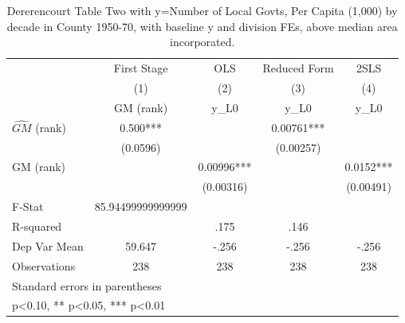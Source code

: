 \begin{table}[htbp]\centering
\def\sym#1{\ifmmode^{#1}\else\(^{#1}\)\fi}
\caption{Dererencourt Table Two with y=Number of Local Govts, Per Capita (1,000) by decade in County 1950-70, with baseline y and division FEs, above median area incorporated.}
\begin{tabular}{l*{4}{c}}
\toprule
                    & First Stage   &         OLS   &Reduced Form   &        2SLS   \\
                    &\multicolumn{1}{c}{(1)}&\multicolumn{1}{c}{(2)}&\multicolumn{1}{c}{(3)}&\multicolumn{1}{c}{(4)}\\
                    &\multicolumn{1}{c}{GM  (rank)}&\multicolumn{1}{c}{y\_L0}&\multicolumn{1}{c}{y\_L0}&\multicolumn{1}{c}{y\_L0}\\
\midrule
$\hat{GM}$ (rank)   &       0.500***&               &     0.00761***&               \\
                    &    (0.0596)   &               &   (0.00257)   &               \\
\addlinespace
GM  (rank)          &               &     0.00996***&               &      0.0152***\\
                    &               &   (0.00316)   &               &   (0.00491)   \\
\midrule
F-Stat              &85.94499999999999   &               &               &               \\
R-squared           &               &        .175   &        .146   &               \\
Dep Var Mean        &      59.647   &       -.256   &       -.256   &       -.256   \\
Observations        &         238   &         238   &         238   &         238   \\
\bottomrule
\multicolumn{5}{l}{\footnotesize Standard errors in parentheses}\\
\multicolumn{5}{l}{\footnotesize * p<0.10, ** p<0.05, *** p<0.01}\\
\end{tabular}
\end{table}
